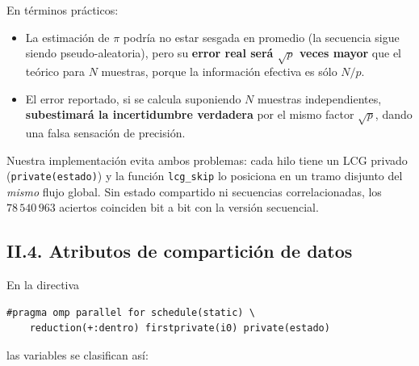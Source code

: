 \documentclass[12pt,a4paper]{article}
\begin{document}
En t\'erminos pr\'acticos:
\begin{itemize}
  \item La estimaci\'on de $\pi$ podr\'ia no estar sesgada en promedio (la secuencia sigue siendo pseudo-aleatoria), pero su \textbf{error real ser\'a $\sqrt{p}$ veces mayor} que el te\'orico para $N$ muestras, porque la informaci\'on efectiva es s\'olo $N/p$.
  \item El error reportado, si se calcula suponiendo $N$ muestras independientes, \textbf{subestimar\'a la incertidumbre verdadera} por el mismo factor $\sqrt{p}$, dando una falsa sensaci\'on de precisi\'on.
\end{itemize}

\smallskip
Nuestra implementaci\'on evita ambos problemas: cada hilo tiene un LCG
privado (\texttt{private(estado)}) y la funci\'on
\texttt{lcg\_skip} lo posiciona en un tramo disjunto del \emph{mismo} flujo
global.  Sin estado compartido ni secuencias correlacionadas, los
$78\,540\,963$ aciertos coinciden bit a bit con la versi\'on secuencial.

\subsection*{II.4. Atributos de compartici\'on de datos}

En la directiva
\begin{verbatim}
#pragma omp parallel for schedule(static) \
    reduction(+:dentro) firstprivate(i0) private(estado)
\end{verbatim}
las variables se clasifican as\'i:
\end{document}

